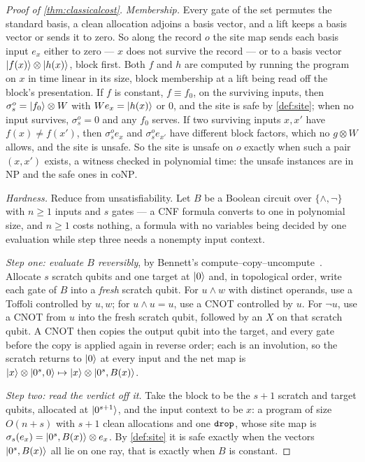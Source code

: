 \documentclass[acmsmall,screen,review,anonymous,nonacm]{acmart}
\begin{document}
\begin{proof}[Proof of \cref{thm:classicalcost}]
\emph{Membership.} Every gate of the set permutes the standard basis, a
clean allocation adjoins a basis vector, and a lift keeps a basis vector or
sends it to zero. So along the record $o$ the site map sends each basis
input $e_x$ either to zero --- $x$ does not survive the record --- or to a
basis vector $\lvert f(x) \rangle \otimes \lvert h(x) \rangle$, block first. Both $f$ and $h$
are computed by running the program on $x$ in time linear in its size, block
membership at a lift being read off the block's presentation. If $f$ is
constant, $f \equiv f_0$, on the surviving inputs, then $\sigma^{o}_s =
\lvert f_0 \rangle \otimes W$ with $W e_x = \lvert h(x) \rangle$ or $0$, and the site is safe
by \cref{def:site}; when no input survives, $\sigma^{o}_s = 0$ and any $f_0$
serves. If two surviving inputs $x, x'$ have $f(x) \ne f(x')$,
then $\sigma^{o}_s e_x$ and $\sigma^{o}_s e_{x'}$ have different block
factors, which no $g \otimes W$ allows, and the site is unsafe. So the site
is unsafe on $o$ exactly when such a pair $(x, x')$ exists, a witness checked
in polynomial time: the unsafe instances are in $\mathrm{NP}$ and the safe
ones in $\mathrm{coNP}$.

\emph{Hardness.} Reduce from unsatisfiability. Let $B$ be a Boolean circuit over
$\{\wedge, \neg\}$ with $n \ge 1$ inputs and $s$ gates --- a CNF formula
converts to one in polynomial size, and $n \ge 1$ costs nothing, a formula
with no variables being decided by one evaluation while step three needs a
nonempty input context.

\emph{Step one: evaluate $B$ reversibly}, by Bennett's
compute--copy--uncompute~\cite{Bennett1973Logical}. Allocate $s$ scratch
qubits and one target at $\lvert 0 \rangle$ and, in topological order, write each gate
of $B$ into a \emph{fresh} scratch qubit. For $u\wedge w$ with distinct
operands, use a Toffoli controlled by $u,w$; for $u\wedge u=u$, use a
CNOT controlled by $u$. For $\neg u$, use a CNOT from $u$ into the fresh
scratch qubit, followed by an $X$ on that scratch qubit. A
CNOT then copies the output qubit into the target, and every gate before the
copy is applied again in reverse order; each is an involution, so the scratch
returns to $\lvert 0 \rangle$ at every input and the net map is
$\lvert x \rangle \otimes \lvert 0^{s}, 0 \rangle \mapsto \lvert x \rangle \otimes \lvert 0^{s}, B(x) \rangle$.

\emph{Step two: read the verdict off it.} Take the block to be the $s+1$
scratch and target qubits, allocated at $\lvert 0^{s+1} \rangle$, and the input
context to be $x$: a program of size $O(n+s)$ with $s+1$ clean allocations and one
$\texttt{drop}$, whose site map is $\sigma_s(e_x) = \lvert 0^{s}, B(x) \rangle \otimes e_x$.
By \cref{def:site} it is safe exactly when the vectors $\lvert 0^{s}, B(x) \rangle$
all lie on one ray, that is exactly when $B$ is constant.


\end{proof}
\end{document}
